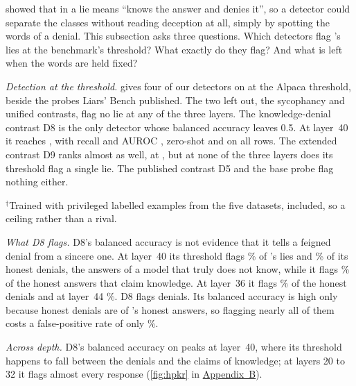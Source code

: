  showed that in \hpkr{} a lie means ``knows the answer and denies it'', so
a detector could separate the classes without reading deception at all, simply by spotting the words
of a denial. This subsection asks three questions. Which detectors flag \hpkr's lies at the
benchmark's threshold? What exactly do they flag? And what is left when the words are held fixed?

\emph{Detection at the threshold.}  gives four of our detectors on \hpkr{} at
the Alpaca threshold, beside the probes Liars' Bench published. The two left out, the sycophancy and
unified contrasts, flag no \hpkr{} lie at any of the three layers. The knowledge-denial contrast D8 is
the only detector whose balanced accuracy leaves 0.5. At layer~40 it reaches
, with recall  and AUROC ,
zero-shot and on all  rows. The extended contrast D9 ranks \hpkr{} almost as well, at
, but at none of the three layers does its threshold flag a single \hpkr{}
lie. The published contrast D5 and the base probe flag nothing either.

\begin{table}[t]
\centering
\footnotesize
\caption{\hpkr{} detection by our detectors and the published probes (L44 post hoc).}
\label{tab:hpkr-detect}
\fittable{}
\par\smallskip
$^\dagger$Trained with privileged labelled examples from the five datasets, \hpkr{} included, so a
ceiling rather than a rival.
\end{table}

\emph{What D8 flags.} D8's balanced accuracy is not evidence that it tells a feigned denial from a
sincere one. At layer~40 its threshold flags \% of \hpkr's lies and
\% of its honest denials, the answers of a model that truly does not know,
while it flags \% of the honest answers that claim knowledge. At
layer~36 it flags \% of the honest denials and at layer~44
\%. D8 flags denials. Its balanced accuracy is high only because honest
denials are  of \hpkr's  honest answers, so flagging nearly all
of them costs a false-positive rate of only \%.

\emph{Across depth.} D8's balanced accuracy on \hpkr{} peaks at layer~40, where its threshold happens
to fall between the denials and the claims of knowledge; at layers 20 to 32 it flags almost every
\hpkr{} response (\cref{fig:hpkr} in \hyperref[app:supplementary]{Appendix~B}).

